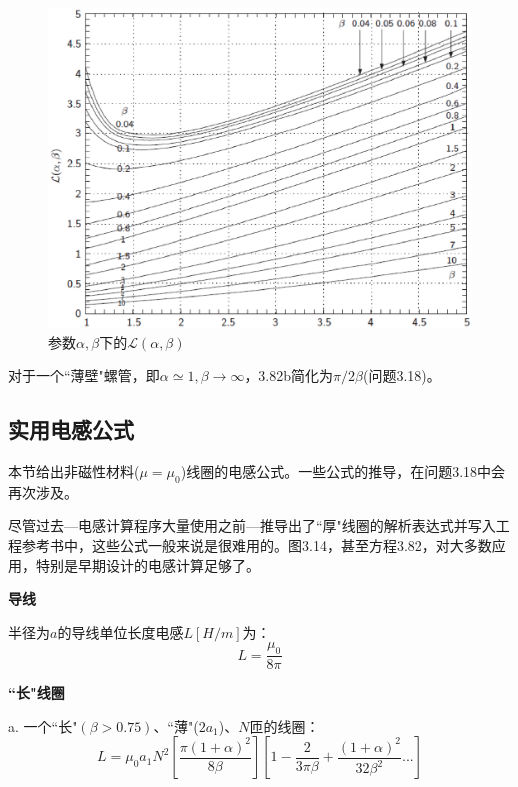 \begin{figure}[htbp]
  \centering
 \includegraphics[scale=0.6]{chpt3/figs/fig3.14.eps}
  \caption{参数$\alpha,\beta$下的$\mathcal{L}(\alpha,\beta)$}
\end{figure}

对于一个``薄壁"螺管，即$\alpha\simeq 1,\beta\rightarrow \infty$，3.82b简化为$\pi/2\beta$(问题3.18)。

\subsection{实用电感公式}
本节给出非磁性材料($\mu=\mu_0$)线圈的电感公式。一些公式的推导，在问题3.18中会再次涉及。

尽管过去---电感计算程序大量使用之前---推导出了``厚"线圈的解析表达式并写入工程参考书中，这些公式一般来说是很难用的。图3.14，甚至方程3.82，对大多数应用，特别是早期设计的电感计算足够了。


\textbf{导线}  
  
  半径为$a$的导线单位长度电感$L[H/m]$为：
  \begin{equation}
         L=\frac{\mu_0}{8\pi}%
  \end{equation}
  
\textbf{``长"线圈} 
  
  a. 一个``长"$(β>0.75)$、``薄"($2a_1$)、$N$匝的线圈：
\begin{equation}
  L=\mu_0a_1N^2\left[\frac{\pi(1+\alpha)^2}{8\beta}\right]\left[1-\frac{2}{3\pi\beta}+\frac{(1+\alpha)^2}{32\beta^2}...\right]%
\end{equation}

